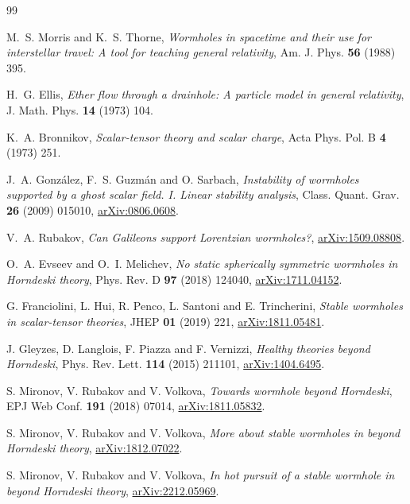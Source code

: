 \documentclass[11pt,a4paper]{article}
\theoremstyle{remark}
\begin{document}
\begin{thebibliography}{99}

 M.~S. Morris and K.~S. Thorne, \emph{Wormholes in spacetime and their use for interstellar travel: A tool for teaching general relativity}, Am. J. Phys. \textbf{56} (1988) 395.

 H.~G. Ellis, \emph{Ether flow through a drainhole: A particle model in general relativity}, J. Math. Phys. \textbf{14} (1973) 104.

 K.~A. Bronnikov, \emph{Scalar-tensor theory and scalar charge}, Acta Phys. Pol. B \textbf{4} (1973) 251.

 J.~A. González, F.~S. Guzmán and O. Sarbach, \emph{Instability of wormholes supported by a ghost scalar field. I. Linear stability analysis}, Class. Quant. Grav. \textbf{26} (2009) 015010, \href{https://arxiv.org/abs/0806.0608}{arXiv:0806.0608}.

 V.~A. Rubakov, \emph{Can Galileons support Lorentzian wormholes?}, \href{https://arxiv.org/abs/1509.08808}{arXiv:1509.08808}.

 O.~A. Evseev and O.~I. Melichev, \emph{No static spherically symmetric wormholes in Horndeski theory}, Phys. Rev. D \textbf{97} (2018) 124040, \href{https://arxiv.org/abs/1711.04152}{arXiv:1711.04152}.

 G. Franciolini, L. Hui, R. Penco, L. Santoni and E. Trincherini, \emph{Stable wormholes in scalar-tensor theories}, JHEP \textbf{01} (2019) 221, \href{https://arxiv.org/abs/1811.05481}{arXiv:1811.05481}.

 J. Gleyzes, D. Langlois, F. Piazza and F. Vernizzi, \emph{Healthy theories beyond Horndeski}, Phys. Rev. Lett. \textbf{114} (2015) 211101, \href{https://arxiv.org/abs/1404.6495}{arXiv:1404.6495}.

 S. Mironov, V. Rubakov and V. Volkova, \emph{Towards wormhole beyond Horndeski}, EPJ Web Conf. \textbf{191} (2018) 07014, \href{https://arxiv.org/abs/1811.05832}{arXiv:1811.05832}.

 S. Mironov, V. Rubakov and V. Volkova, \emph{More about stable wormholes in beyond Horndeski theory}, \href{https://arxiv.org/abs/1812.07022}{arXiv:1812.07022}.

 S. Mironov, V. Rubakov and V. Volkova, \emph{In hot pursuit of a stable wormhole in beyond Horndeski theory}, \href{https://arxiv.org/abs/2212.05969}{arXiv:2212.05969}.


\end{thebibliography}
\end{document}

